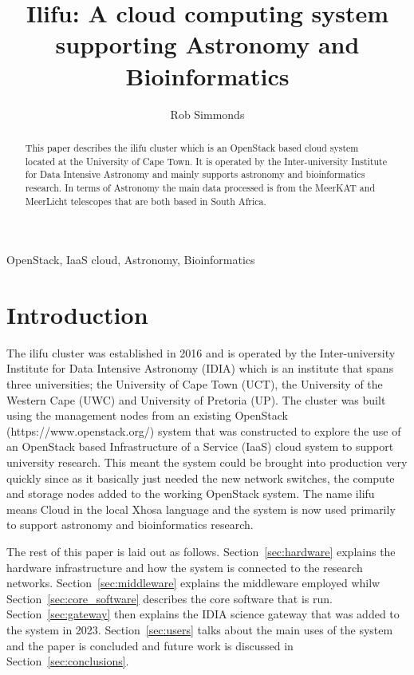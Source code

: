 \documentclass{iau_FM}
\title{Ilifu: A cloud computing system supporting Astronomy and Bioinformatics}
\author{Rob Simmonds}
\affiliation{Inter-university Institute for Data Intensive Astronomy \\ South Africa}
\begin{document}
\maketitle

\begin{abstract}
This paper describes the ilifu cluster which is an OpenStack based cloud system located at the University of Cape Town. 
It is operated by the Inter-university Institute for Data Intensive Astronomy and mainly supports 
astronomy and bioinformatics research. In terms of Astronomy the main data processed is from the MeerKAT and MeerLicht 
telescopes that are both based in South Africa.
 \end{abstract}
  OpenStack, IaaS cloud, Astronomy, Bioinformatics

\section{Introduction}
 
The ilifu cluster was established in 2016 and 
is operated by the Inter-university Institute for Data Intensive Astronomy (IDIA) which is an
institute that spans three universities; the University of Cape Town (UCT), 
the University of the 
Western Cape (UWC) and University of Pretoria (UP).
The cluster was built using the management nodes from an 
existing OpenStack (https://www.openstack.org/) system that was constructed to explore the 
use of an OpenStack based Infrastructure of a Service (IaaS) cloud system to support university research. 
This meant the
system could be brought into production very quickly since as it basically just needed the new
network switches, the compute and storage nodes added to the working OpenStack system.
The name ilifu means
Cloud in the local Xhosa language and the system is now used primarily to support
astronomy and bioinformatics research.

The rest of this paper is laid out as follows. Section~\ref{sec:hardware}
 explains the hardware infrastructure and how
the system is connected to the research networks. Section~\ref{sec:middleware} 
explains the middleware employed whilw
Section~\ref{sec:core_software} describes the core software that is run.
Section~\ref{sec:gateway} then explains the IDIA
science gateway that was added to the system in 2023. Section~\ref{sec:users}
talks about the main uses of the system and 
the paper is concluded and future work is discussed in
Section~\ref{sec:conclusions}.
\end{document}
